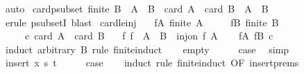 \begin{isabellebody}
\isamarkupfalse%
\ auto%
\endisatagproof
{\isafoldproof}%
%
\isadelimproof
\isanewline
%
\endisadelimproof
\isanewline
{}\isamarkupfalse%
\ card{\isacharunderscore}{\kern0pt}psubset{\isacharcolon}{\kern0pt}\ {\isachardoublequoteopen}finite\ B\ {\isasymLongrightarrow}\ A\ {\isasymsubseteq}\ B\ {\isasymLongrightarrow}\ card\ A\ {\isacharless}{\kern0pt}\ card\ B\ {\isasymLongrightarrow}\ A\ {\isacharless}{\kern0pt}\ B{\isachardoublequoteclose}\isanewline
%
\isadelimproof
\ \ %
\endisadelimproof
%
\isatagproof
{}\isamarkupfalse%
\ {\isacharparenleft}{\kern0pt}erule\ psubsetI{\isacharparenright}{\kern0pt}\ blast%
\endisatagproof
{\isafoldproof}%
%
\isadelimproof
\isanewline
%
\endisadelimproof
\isanewline
{}\isamarkupfalse%
\ card{\isacharunderscore}{\kern0pt}le{\isacharunderscore}{\kern0pt}inj{\isacharcolon}{\kern0pt}\isanewline
\ \ \ fA{\isacharcolon}{\kern0pt}\ {\isachardoublequoteopen}finite\ A{\isachardoublequoteclose}\isanewline
\ \ \ \ \ fB{\isacharcolon}{\kern0pt}\ {\isachardoublequoteopen}finite\ B{\isachardoublequoteclose}\isanewline
\ \ \ \ \ c{\isacharcolon}{\kern0pt}\ {\isachardoublequoteopen}card\ A\ {\isasymle}\ card\ B{\isachardoublequoteclose}\isanewline
\ \ \ {\isachardoublequoteopen}{\isasymexists}f{\isachardot}{\kern0pt}\ f\ {\isacharbackquote}{\kern0pt}\ A\ {\isasymsubseteq}\ B\ {\isasymand}\ inj{\isacharunderscore}{\kern0pt}on\ f\ A{\isachardoublequoteclose}\isanewline
%
\isadelimproof
\ \ %
\endisadelimproof
%
\isatagproof
{}\isamarkupfalse%
\ fA\ fB\ c\isanewline
{}\isamarkupfalse%
\ {\isacharparenleft}{\kern0pt}induct\ arbitrary{\isacharcolon}{\kern0pt}\ B\ rule{\isacharcolon}{\kern0pt}\ finite{\isacharunderscore}{\kern0pt}induct{\isacharparenright}{\kern0pt}\isanewline
\ \ \isamarkupfalse%
\ empty\isanewline
\ \ \isamarkupfalse%
\ \isamarkupfalse%
\ {\isacharquery}{\kern0pt}case\ \isamarkupfalse%
\ simp\isanewline
{}\isamarkupfalse%
\isanewline
\ \ \isamarkupfalse%
\ {\isacharparenleft}{\kern0pt}insert\ x\ s\ t{\isacharparenright}{\kern0pt}\isanewline
\ \ \isamarkupfalse%
\ \isamarkupfalse%
\ {\isacharquery}{\kern0pt}case\isanewline
\ \ \isamarkupfalse%
\ {\isacharparenleft}{\kern0pt}induct\ rule{\isacharcolon}{\kern0pt}\ finite{\isacharunderscore}{\kern0pt}induct\ {\isacharbrackleft}{\kern0pt}OF\ insert{\isachardot}{\kern0pt}prems{\isacharparenleft}{\kern0pt}{}{\isacharparenright}{\kern0pt}{\isacharbrackright}{\kern0pt}{\isacharparenright}{\kern0pt}\isanewline

\end{isabellebody}
